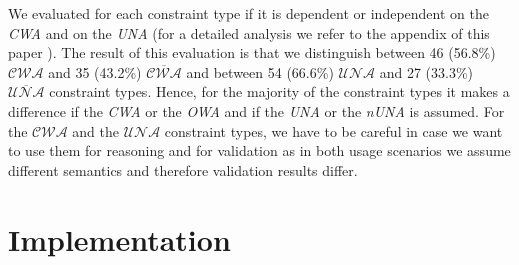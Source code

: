 \documentclass{acm_proc_article-sp}
\begin{document}
We evaluated for each constraint type 
if it is dependent or independent on the \emph{CWA} and on the \emph{UNA} (for a detailed analysis we refer to the appendix of this paper \cite{BoschNolleAcarEckert2015}). 
The result of this evaluation is that we distinguish between 46 (56.8\%) $\mathcal{CWA}$ and 35 (43.2\%) $\overline{\mathcal{CWA}}$ and between 54 (66.6\%) $\mathcal{UNA}$ and 27 (33.3\%) $\overline{\mathcal{UNA}}$ constraint types.
Hence, for the majority of the constraint types it makes a difference if the \emph{CWA} or the \emph{OWA} and if the \emph{UNA} or the \emph{nUNA} is assumed.
For the $\mathcal{CWA}$ and the $\mathcal{UNA}$ constraint types, we have to be careful in case we want to use them for reasoning and for validation
as in both usage scenarios we assume different semantics and therefore validation results differ.
%
%

\section{Implementation}
\label{implementation}
\end{document}
